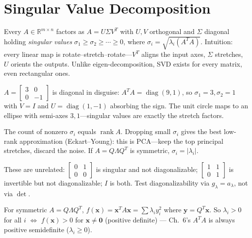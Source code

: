 \section{Singular Value Decomposition}
\label{sec:svd}
Every $A\in\mathbb{R}^{m\times n}$ factors as $A=U\Sigma V^T$ with $U,V$ orthogonal and $\Sigma$ diagonal holding \emph{singular values} $\sigma_1\ge\sigma_2\ge\cdots\ge0$, where $\sigma_i=\sqrt{\lambda_i(A^TA)}$. Intuition: every linear map is rotate--stretch--rotate---$V^T$ aligns the input axes, $\Sigma$ stretches, $U$ orients the outputs. Unlike eigen-decomposition, SVD exists for every matrix, even rectangular ones.
\begin{example}
$A=\begin{bmatrix}3&0\\0&-1\end{bmatrix}$ is diagonal in disguise: $A^TA=\operatorname{diag}(9,1)$, so $\sigma_1=3,\sigma_2=1$ with $V=I$ and $U=\operatorname{diag}(1,-1)$ absorbing the sign. The unit circle maps to an ellipse with semi-axes $3,1$---singular values are exactly the stretch factors.
\end{example}
The count of nonzero $\sigma_i$ equals $\operatorname{rank}A$. Dropping small $\sigma_i$ gives the best low-rank approximation (Eckart--Young): this is PCA---keep the top principal stretches, discard the noise. If $A=Q\Lambda Q^T$ is symmetric, $\sigma_i=|\lambda_i|$.



\begin{remark}
These are unrelated: $\begin{bmatrix}0&1\\0&0\end{bmatrix}$ is singular and not diagonalizable; $\begin{bmatrix}1&1\\0&1\end{bmatrix}$ is invertible but not diagonalizable; $I$ is both. Test diagonalizability via $g_\lambda=a_\lambda$, not via $\det$.
\end{remark}

\begin{example}
For symmetric $A=Q\Lambda Q^T$, $f(\mathbf{x})=\mathbf{x}^TA\mathbf{x}=\sum\lambda_i y_i^2$ where $\mathbf{y}=Q^T\mathbf{x}$. So $\lambda_i>0$ for all $i$ $\iff$ $f(\mathbf{x})>0$ for $\mathbf{x}\neq\mathbf{0}$ (positive definite) --- Ch.~6's $A^TA$ is always positive semidefinite ($\lambda_i\ge0$).
\end{example}




